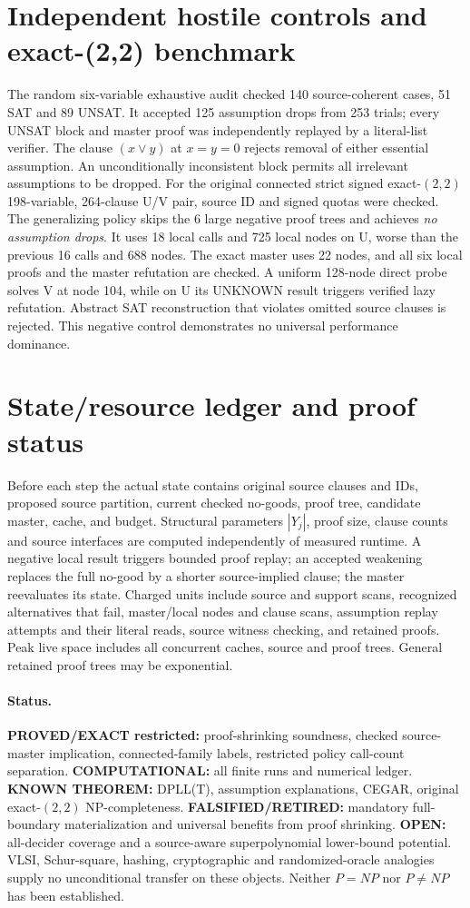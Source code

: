 \documentclass[11pt]{article}
\begin{document}
\section{Independent hostile controls and exact-(2,2) benchmark}
The random six-variable exhaustive audit checked 140 source-coherent cases, 51 SAT and 89 UNSAT. It accepted 125 assumption drops from 253 trials; every UNSAT block and master proof was independently replayed by a literal-list verifier. The clause $(x\vee y)$ at $x=y=0$ rejects removal of either essential assumption. An unconditionally inconsistent block permits all irrelevant assumptions to be dropped.
For the original connected strict signed exact-$(2,2)$ 198-variable, 264-clause U/V pair, source ID and signed quotas were checked. The generalizing policy skips the 6 large negative proof trees and achieves \emph{no assumption drops}. It uses 18 local calls and 725 local nodes on U, worse than the previous 16 calls and 688 nodes. The exact master uses 22 nodes, and all six local proofs and the master refutation are checked. A uniform 128-node direct probe solves V at node 104, while on U its UNKNOWN result triggers verified lazy refutation. Abstract SAT reconstruction that violates omitted source clauses is rejected. This negative control demonstrates no universal performance dominance.
\section{State/resource ledger and proof status}
Before each step the actual state contains original source clauses and IDs, proposed source partition, current checked no-goods, proof tree, candidate master, cache, and budget. Structural parameters $|Y_j|$, proof size, clause counts and source interfaces are computed independently of measured runtime. A negative local result triggers bounded proof replay; an accepted weakening replaces the full no-good by a shorter source-implied clause; the master reevaluates its state. Charged units include source and support scans, recognized alternatives that fail, master/local nodes and clause scans, assumption replay attempts and their literal reads, source witness checking, and retained proofs. Peak live space includes all concurrent caches, source and proof trees. General retained proof trees may be exponential.
\paragraph{Status.}
\textbf{PROVED/EXACT restricted:} proof-shrinking soundness, checked source-master implication, connected-family labels, restricted policy call-count separation. \textbf{COMPUTATIONAL:} all finite runs and numerical ledger. \textbf{KNOWN THEOREM:} DPLL(T), assumption explanations, CEGAR, original exact-$(2,2)$ NP-completeness. \textbf{FALSIFIED/RETIRED:} mandatory full-boundary materialization and universal benefits from proof shrinking. \textbf{OPEN:} all-decider coverage and a source-aware superpolynomial lower-bound potential. VLSI, Schur-square, hashing, cryptographic and randomized-oracle analogies supply no unconditional transfer on these objects. Neither $P=NP$ nor $P\ne NP$ has been established.
\end{document}
